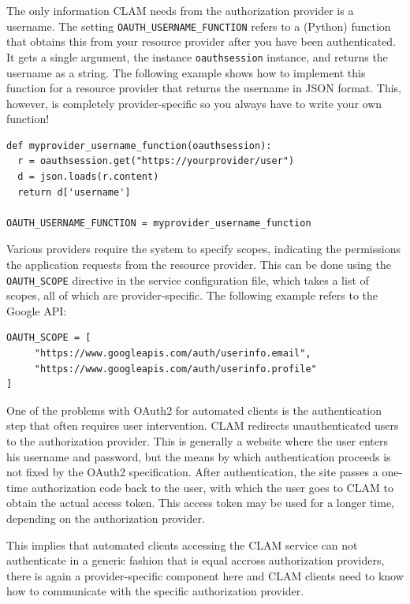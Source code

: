 \documentclass[a4paper,12pt,twoside,openright]{report}
\begin{document}
The only information CLAM needs from the authorization provider is a username.
The setting \texttt{OAUTH\_USERNAME\_FUNCTION} refers to a (Python) function
that obtains this from your resource provider after you have been
authenticated. It gets a single argument, the instance \texttt{oauthsession}
instance, and returns the username as a string.  The following example shows
how to implement this function for a resource provider that returns the
username in JSON format. This, however, is completely provider-specific so
you always have to write your own function! 

{ \small
\begin{verbatim}
def myprovider_username_function(oauthsession):
  r = oauthsession.get("https://yourprovider/user")
  d = json.loads(r.content)
  return d['username']

OAUTH_USERNAME_FUNCTION = myprovider_username_function
\end{verbatim}
}

Various providers require the system to specify scopes, indicating the
permissions the application requests from the resource provider. This can be
done using the \texttt{OAUTH\_SCOPE} directive in the service configuration
file, which takes a list of scopes, all of which are provider-specific. The
following example refers to the Google API:

{ \small
\begin{verbatim}
OAUTH_SCOPE = [
     "https://www.googleapis.com/auth/userinfo.email",
     "https://www.googleapis.com/auth/userinfo.profile"
]
\end{verbatim}
}

One of the problems with OAuth2 for automated clients is the authentication
step that often requires user intervention. CLAM redirects unauthenticated
users to the authorization provider. This is generally a website where the user
enters his username and password, but the means by which authentication
proceeds is not fixed by the OAuth2 specification. After authentication, the
site passes a one-time authorization code back to the user, with which the user
goes to CLAM to obtain the actual access token. This access token may be used
for a longer time, depending on the authorization provider.

This implies that automated clients accessing the CLAM service can not
authenticate in a generic fashion that is equal accross authorization
providers, there is again a provider-specific component here and CLAM clients
need to know how to communicate with the specific authorization provider.
\end{document}
